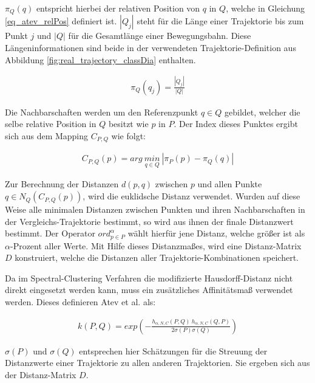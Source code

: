 $\pi_Q(q)$ entspricht hierbei der relativen Position von $q$ in $Q$, welche in Gleichung \ref{eq_atev_relPos} definiert ist.
$|Q_j|$ steht für die Länge einer Trajektorie bis zum Punkt $j$ und $|Q|$ für die Gesamtlänge einer Bewegungsbahn.
Diese Längeninformationen sind beide in der verwendeten Trajektorie-Definition aus Abbildung
\ref{fig:real_trajectory_classDia} enthalten.

\begin{ceqn}
\begin{align}
\label{eq_atev_relPos}
    \pi_Q(q_j) = \frac{|Q_j|}{|Q|}
\end{align}
\end{ceqn}

Die Nachbarschaften werden um den Referenzpunkt $q \in Q$ gebildet, welcher die selbe relative Position
in $Q$ besitzt wie $p$ in $P$. Der Index dieses Punktes ergibt sich aus dem Mapping $C_{P,Q}$ wie folgt:

\begin{ceqn}
\begin{align}
\label{eq_atev_findPointAtRelPow}
    C_{P,Q}(p) = arg\ \underset{q \in Q}{min}\ |\pi_P(p) - \pi_Q(q)|
\end{align}
\end{ceqn}

Zur Berechnung der Distanzen $d(p,q)$ zwischen $p$ und allen Punkte $q \in N_Q(C_{P,Q}(p))$, wird die euklidsche
Distanz verwendet. Wurden auf diese Weise alle minimalen Distanzen zwischen Punkten und ihren Nachbarschaften in
der Vergleichs-Trajektorie bestimmt, so wird aus ihnen der finale Distanzwert bestimmt. Der Operator
$ord_{p \in P}^{\alpha}$ wählt hierfür jene Distanz, welche größer ist als $\alpha$-Prozent aller Werte.
Mit Hilfe dieses Distanzmaßes, wird eine Distanz-Matrix $D$ konstruiert, welche die Distanzen
aller Trajektorie-Kombinationen speichert.

Da im Spectral-Clustering Verfahren die modifizierte Hausdorff-Distanz nicht direkt eingesetzt werden kann,
muss ein zusätzliches Affinitätsmaß verwendet werden. %
Dieses definieren Atev et al. als:

\begin{ceqn}
\begin{align}
    k(P,Q) = exp (- \frac{h_{\alpha, N, C}(P,Q)\ h_{\alpha, N, C}(Q,P)}{2 \sigma(P) \sigma(Q)})
\end{align}
\end{ceqn}

$\sigma(P)$ und $\sigma(Q)$ entsprechen hier Schätzungen für die Streuung der Distanzwerte einer Trajektorie
zu allen anderen Trajektorien. Sie ergeben sich aus der Distanz-Matrix $D$.


